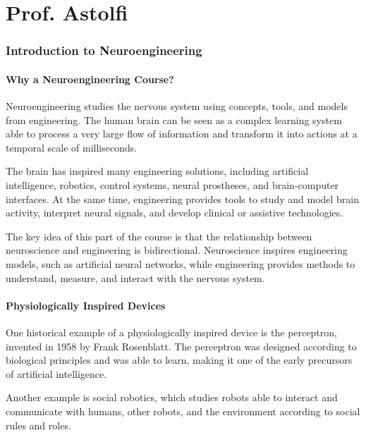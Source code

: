 
\part{Prof. Astolfi}

\section{Introduction to Neuroengineering}

\subsection{Why a Neuroengineering Course?}

Neuroengineering studies the nervous system using concepts, tools, and models from engineering. The human brain can be seen as a complex learning system able to process a very large flow of information and transform it into actions at a temporal scale of milliseconds.

The brain has inspired many engineering solutions, including artificial intelligence, robotics, control systems, neural prostheses, and brain-computer interfaces. At the same time, engineering provides tools to study and model brain activity, interpret neural signals, and develop clinical or assistive technologies.

\begin{authornote}
The key idea of this part of the course is that the relationship between neuroscience and engineering is bidirectional. Neuroscience inspires engineering models, such as artificial neural networks, while engineering provides methods to understand, measure, and interact with the nervous system.
\end{authornote}

\subsection{Physiologically Inspired Devices}

One historical example of a physiologically inspired device is the perceptron, invented in 1958 by Frank Rosenblatt. The perceptron was designed according to biological principles and was able to learn, making it one of the early precursors of artificial intelligence.

Another example is social robotics, which studies robots able to interact and communicate with humans, other robots, and the environment according to social rules and roles.

